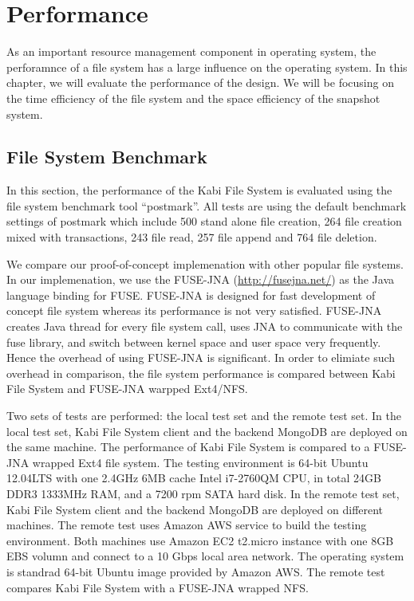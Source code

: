 \chapter{Performance}
\label{chap:perform}

    As an important resource management component in operating system, the perforamnce of a file system has a large influence on the operating system. In this chapter, we will evaluate the performance of the design. We will be focusing on the time efficiency of the file system and the space efficiency of the snapshot system.

\section{File System Benchmark}

    In this section, the performance of the Kabi File System is evaluated using the file system benchmark tool ``postmark''\cite{postmark}. All tests are using the default benchmark settings of postmark which include 500 stand alone file creation, 264 file creation mixed with transactions, 243 file read, 257 file append and 764 file deletion.

    We compare our proof-of-concept implemenation with other popular file systems. In our implemenation, we use the FUSE-JNA (\url{http://fusejna.net/}) as the Java language binding for FUSE. FUSE-JNA is designed for fast development of concept file system whereas its performance is not very satisfied. FUSE-JNA creates Java thread for every file system call, uses JNA to communicate with the fuse library, and switch between kernel space and user space very frequently. Hence the overhead of using FUSE-JNA is significant. In order to elimiate such overhead in comparison, the file system performance is compared between Kabi File System and FUSE-JNA warpped Ext4/NFS.

    Two sets of tests are performed: the local test set and the remote test set. In the local test set, Kabi File System client and the backend MongoDB are deployed on the same machine. The performance of Kabi File System is compared to a FUSE-JNA wrapped Ext4 file system. The testing environment is 64-bit Ubuntu 12.04LTS with one 2.4GHz 6MB cache Intel i7-2760QM CPU, in total 24GB DDR3 1333MHz RAM, and a 7200 rpm SATA hard disk. In the remote test set, Kabi File System client and the backend MongoDB are deployed on different machines. The remote test uses Amazon AWS service to build the testing environment. Both machines use Amazon EC2 t2.micro instance with one 8GB EBS volumn and connect to a 10 Gbps local area network. The operating system is standrad 64-bit Ubuntu image provided by Amazon AWS. The remote test compares Kabi File System with a FUSE-JNA wrapped NFS. 

